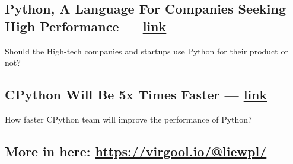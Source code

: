 \begin{multicols}{2}
\subsection{{Python, A Language For Companies Seeking High Performance --- \href{https://vrgl.ir/29p56}{link}}}
\begin{zitemize}
\item Should the High-tech companies and startups use Python for their product or not?
\end{zitemize}

\subsection{{CPython Will Be 5x Times Faster --- \href{https://virgool.io/@liewpl/cpython-five-times-faster-p5jve4zzywog}{link}}}
\begin{zitemize}
\item How faster CPython team will improve the performance of Python?
\end{zitemize}

\subsection{{More in here: \href{https://virgool.io/@liewpl/}{https://virgool.io/@liewpl/}}}

\end{multicols}